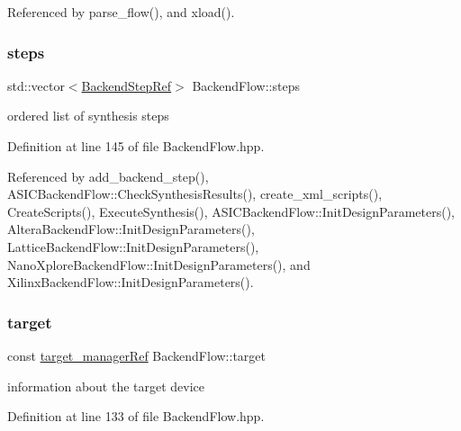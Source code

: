 Referenced by parse\+\_\+flow(), and xload().

\mbox{\label{classBackendFlow_a8e2f17698c827b202321df499b46eba8}} 
\subsubsection{\texorpdfstring{steps}{steps}}
{\footnotesize\ttfamily std\+::vector$<$\hyperlink{BackendFlow_8hpp_ab49214bb532f4d4cce15fd2e89eff5d7}{Backend\+Step\+Ref}$>$ Backend\+Flow\+::steps\hspace{0.3cm}{\ttfamily [protected]}}



ordered list of synthesis steps 



Definition at line 145 of file Backend\+Flow.\+hpp.



Referenced by add\+\_\+backend\+\_\+step(), A\+S\+I\+C\+Backend\+Flow\+::\+Check\+Synthesis\+Results(), create\+\_\+xml\+\_\+scripts(), Create\+Scripts(), Execute\+Synthesis(), A\+S\+I\+C\+Backend\+Flow\+::\+Init\+Design\+Parameters(), Altera\+Backend\+Flow\+::\+Init\+Design\+Parameters(), Lattice\+Backend\+Flow\+::\+Init\+Design\+Parameters(), Nano\+Xplore\+Backend\+Flow\+::\+Init\+Design\+Parameters(), and Xilinx\+Backend\+Flow\+::\+Init\+Design\+Parameters().

\mbox{\label{classBackendFlow_a693ab6eaf29b1836eb91dcd92eb0189f}} 
\subsubsection{\texorpdfstring{target}{target}}
{\footnotesize\ttfamily const \hyperlink{target__manager_8hpp_aee0b586a84fb6eb4faefa6e41e1735a9}{target\+\_\+manager\+Ref} Backend\+Flow\+::target\hspace{0.3cm}{\ttfamily [protected]}}



information about the target device 



Definition at line 133 of file Backend\+Flow.\+hpp.



